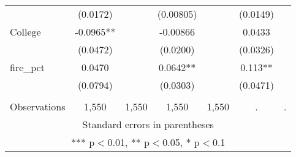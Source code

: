 \begin{tabular}{lcccccc}
 & (0.0172) &  & (0.00805) &  & (0.0149) &  \\
College & -0.0965** &  & -0.00866 &  & 0.0433 &  \\
 & (0.0472) &  & (0.0200) &  & (0.0326) &  \\
fire\_pct & 0.0470 &  & 0.0642** &  & 0.113** &  \\
 & (0.0794) &  & (0.0303) &  & (0.0471) &  \\
 &  &  &  &  &  &  \\
 Observations & 1,550 & 1,550 & 1,550 & 1,550 & . & . \\ \hline
\multicolumn{7}{c}{ Standard errors in parentheses} \\
\multicolumn{7}{c}{ *** p$<$0.01, ** p$<$0.05, * p$<$0.1} \\
\end{tabular}
